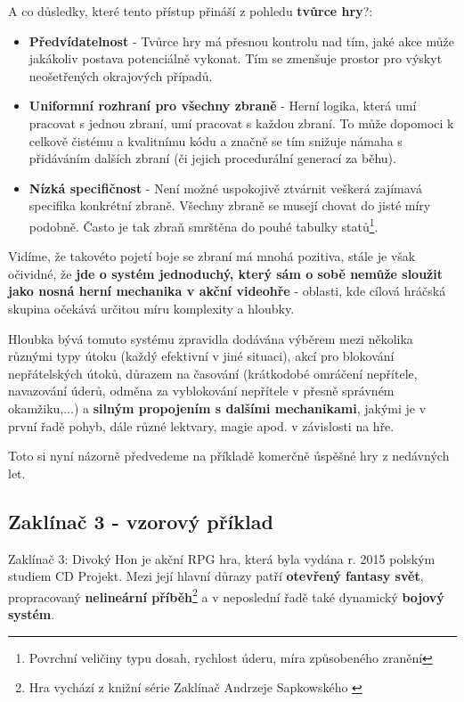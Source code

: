A co důsledky, které tento přístup přináší z pohledu \textbf{tvůrce hry}?:
\begin{itemize}
    \item \textbf{Předvídatelnost} - Tvůrce hry má přesnou kontrolu nad tím, jaké akce může jakákoliv postava potenciálně vykonat. Tím se zmenšuje prostor pro výskyt neošetřených okrajových případů.
    \item \textbf{Uniformní rozhraní pro všechny zbraně} - Herní logika, která umí pracovat s jednou zbraní, umí pracovat s každou zbraní. To může dopomoci k celkově čistému a kvalitnímu kódu a značně se tím snižuje námaha s přidáváním dalších zbraní (či jejich procedurální generací za běhu).
    \item \textbf{Nízká specifičnost} - Není možné uspokojivě ztvárnit veškerá zajímavá specifika konkrétní zbraně. Všechny zbraně se musejí chovat do jisté míry podobně. Často je tak zbraň smrštěna do pouhé tabulky statů\footnote{Povrchní veličiny typu dosah, rychlost úderu, míra způsobeného zranění}.
\end{itemize}

Vidíme, že takovéto pojetí boje se zbraní má mnohá pozitiva, stále je však očividné, že \textbf{jde o systém jednoduchý, který sám o sobě nemůže sloužit jako nosná herní mechanika v akční videohře} - oblasti, kde cílová hráčská skupina očekává určitou míru komplexity a hloubky.

Hloubka bývá tomuto systému zpravidla dodávána výběrem mezi několika různými typy útoku (každý efektivní v jiné situaci), akcí pro blokování nepřátelských útoků, důrazem na časování (krátkodobé omráčení nepřítele, navazování úderů, odměna za vyblokování nepřítele v přesně správném okamžiku,...) a \textbf{silným propojením s dalšími mechanikami}, jakými je v první řadě pohyb, dále různé lektvary, magie apod. v závislosti na hře.

Toto si nyní názorně předvedeme na příkladě komerčně úspěšné hry z nedávných let.

\subsection{Zaklínač 3 - vzorový příklad}
Zaklínač 3: Divoký Hon \cite{Wiedzmin3} je akční \acs{RPG} hra, která byla vydána r. 2015 polským studiem CD Projekt. Mezi její hlavní důrazy patří \textbf{otevřený fantasy svět}, propracovaný \textbf{nelineární příběh}\footnote{Hra vychází z knižní série Zaklínač Andrzeje Sapkowského \cite{SapkowskiZaklinac}} a v neposlední řadě také dynamický \textbf{bojový systém}.

